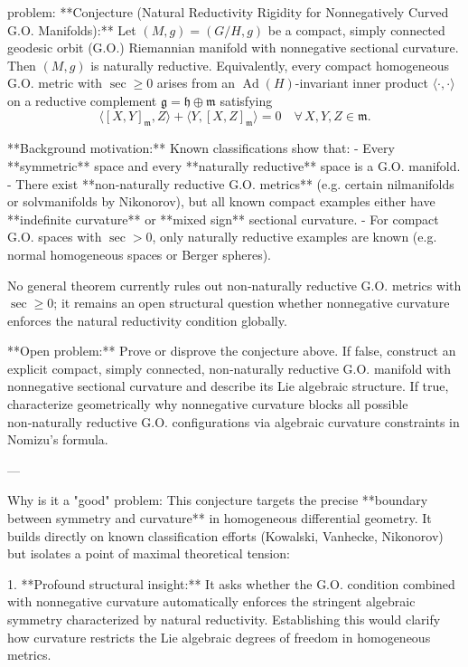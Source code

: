 problem:  
**Conjecture (Natural Reductivity Rigidity for Nonnegatively Curved G.O. Manifolds):**  
Let \((M,g) = (G/H, g)\) be a compact, simply connected geodesic orbit (G.O.) Riemannian manifold with nonnegative sectional curvature. Then \((M,g)\) is naturally reductive. Equivalently, every compact homogeneous G.O. metric with \(\sec \ge 0\) arises from an \(\operatorname{Ad}(H)\)-invariant inner product \(\langle\cdot,\cdot\rangle\) on a reductive complement \(\mathfrak{g} = \mathfrak{h} \oplus \mathfrak{m}\) satisfying  
\[
\langle [X,Y]_{\mathfrak{m}}, Z\rangle + \langle Y, [X,Z]_{\mathfrak{m}}\rangle = 0 \quad \forall\, X,Y,Z \in \mathfrak{m}.
\]

**Background motivation:**  
Known classifications show that:  
- Every **symmetric** space and every **naturally reductive** space is a G.O. manifold.  
- There exist **non‑naturally reductive G.O. metrics** (e.g. certain nilmanifolds or solvmanifolds by Nikonorov), but all known compact examples either have **indefinite curvature** or **mixed sign** sectional curvature.  
- For compact G.O. spaces with \(\sec > 0\), only naturally reductive examples are known (e.g. normal homogeneous spaces or Berger spheres).  

No general theorem currently rules out non‑naturally reductive G.O. metrics with \(\sec \ge 0\); it remains an open structural question whether nonnegative curvature enforces the natural reductivity condition globally.

**Open problem:**  
Prove or disprove the conjecture above. If false, construct an explicit compact, simply connected, non‑naturally reductive G.O. manifold with nonnegative sectional curvature and describe its Lie algebraic structure. If true, characterize geometrically why nonnegative curvature blocks all possible non‑naturally reductive G.O. configurations via algebraic curvature constraints in Nomizu’s formula.

---

Why is it a "good" problem:  
This conjecture targets the precise **boundary between symmetry and curvature** in homogeneous differential geometry. It builds directly on known classification efforts (Kowalski, Vanhecke, Nikonorov) but isolates a point of maximal theoretical tension:

1. **Profound structural insight:** It asks whether the G.O. condition combined with nonnegative curvature automatically enforces the stringent algebraic symmetry characterized by natural reductivity. Establishing this would clarify how curvature restricts the Lie algebraic degrees of freedom in homogeneous metrics.

